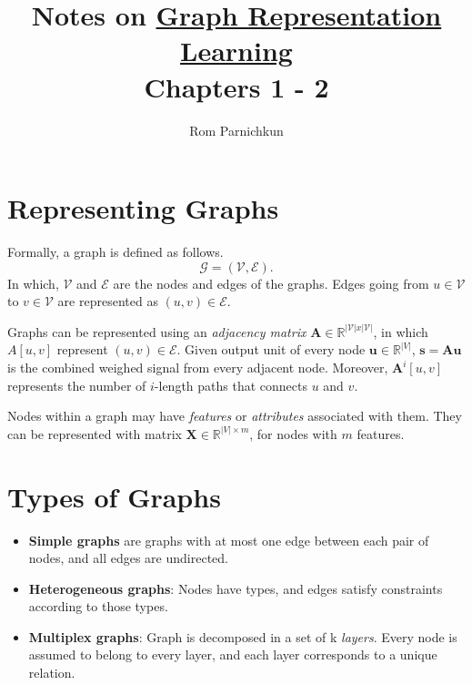 \documentclass[twocolumn]{article}
\theoremstyle{plain}
\begin{document}
\title{Notes on \href{https://www.cs.mcgill.ca/~wlh/grl_book/files/GRL_Book.pdf}{Graph Representation Learning}\\\small{Chapters 1 - 2}}
\author{Rom Parnichkun}

\maketitle

\section{Representing Graphs}

Formally, a graph is defined as follows.
\begin{equation}
\mathcal{G} = (\mathcal{V}, \mathcal{E}).
\end{equation}
In which, $\mathcal{V}$ and $\mathcal{E}$ are the nodes and edges of the graphs. Edges going from $u \in \mathcal{V}$ to $v \in \mathcal{V}$ are represented as $(u,v) \in \mathcal{E}$.

Graphs can be represented using an \textit{adjacency matrix} $\textbf{A} \in \mathbb{R}^{|\mathcal{V}|x|\mathcal{V}|}$, in which $A[u,v]$ represent $(u,v) \in \mathcal{E}$. Given output unit of every node $\mathbf{u} \in \mathbb{R}^{|V|}$, $\mathbf{s} = \mathbf{A}\mathbf{u}$ is the combined weighed signal from every adjacent node. Moreover, $\mathbf{A}^i[u,v]$ represents the number of $i$-length paths that connects $u$ and $v$.

Nodes within a graph may have \textit{features} or \textit{attributes} associated with them. They can be represented with matrix $\textbf{X} \in \mathbb{R}^{|V|\times m}$, for nodes with $m$ features.

\section{Types of Graphs}

\begin{itemize}
    \item \label{simple_graph} \textbf{Simple graphs} are graphs with at most one edge between each pair of nodes, and all edges are undirected.
    \item \textbf{Heterogeneous graphs}: Nodes have types, and edges satisfy constraints according to those types.
    \item \textbf{Multiplex graphs}: Graph is decomposed in a set of k \textit{layers}. Every node is assumed to belong to every layer, and each layer corresponds to a unique relation.
\end{itemize}
\end{document}
